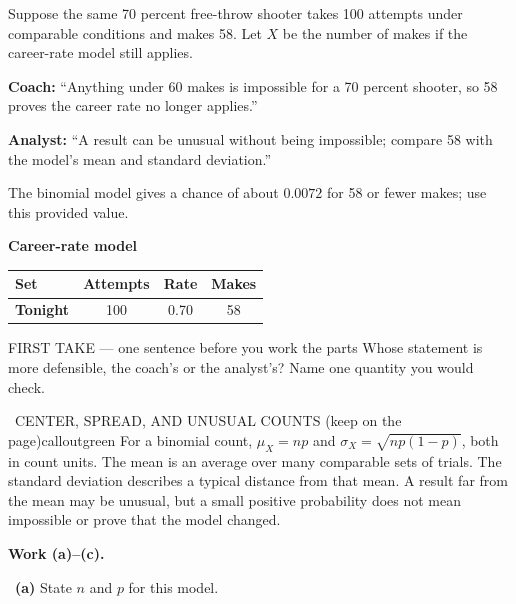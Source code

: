 \documentclass[11pt]{article}
\begin{document}


Suppose the same 70 percent free-throw shooter takes 100 attempts under comparable conditions and makes 58. Let $X$ be the number of makes if the career-rate model still applies.\par\smallskip \textbf{Coach:} ``Anything under 60 makes is impossible for a 70 percent shooter, so 58 proves the career rate no longer applies.''\par \textbf{Analyst:} ``A result can be unusual without being impossible; compare 58 with the model's mean and standard deviation.''\par The binomial model gives a chance of about $0.0072$ for 58 or fewer makes; use this provided value.\par
\begin{center}
\textbf{Career-rate model}\par\smallskip
\begin{tabular}{|l|c|c|c|}
\hline
\textbf{Set} & \textbf{Attempts} & \textbf{Rate} & \textbf{Makes} \\ \hline
\textbf{Tonight} & 100 & 0.70 & 58 \\ \hline
\end{tabular}
\end{center}
\begin{firsttakebox}{FIRST TAKE --- one sentence before you work the parts}
Whose statement is more defensible, the coach's or the analyst's? Name one quantity you would check.
\workspace{0.9in}
\end{firsttakebox}

\begin{callout}{\IconBook\ CENTER, SPREAD, AND UNUSUAL COUNTS (keep on the page)}{calloutgreen}
For a binomial count, $\mu_X=np$ and $\sigma_X=\sqrt{np(1-p)}$, both in count units. The mean is an average over many comparable sets of trials. The standard deviation describes a typical distance from that mean. A result far from the mean may be unusual, but a small positive probability does not mean impossible or prove that the model changed.
\end{callout}

\newpage
\textbf{Work (a)--(c).}\par\smallskip

~\textbf{(a)} State $n$ and $p$ for this model.\par
\workspace{0.8in}
\end{document}
